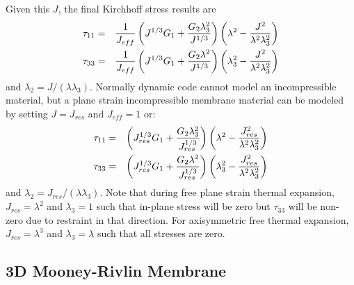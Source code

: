 \documentclass[11pt]{book}
\def\Jeff{J_{eff}}
\def\Jres{J_{res}}
\begin{document}
Given this $J$, the final Kirchhoff stress results are
\begin{eqnarray}
     \tau_{11} & = & {1\over \Jeff}\left(J^{1/3}G_1 + {G_2\lambda_3^2\over J^{1/3}}\right)
                       \left(\lambda^2-{J^2\over\lambda^2\lambda_3^2}\right) \\
     \tau_{33} & = & {1\over \Jeff}\left(J^{1/3}G_1 + {G_2\lambda^2\over J^{1/3}}\right)\left(\lambda_3^2-{J^2\over\lambda^2\lambda_3^2}\right)
\end{eqnarray}
and $\lambda_2 = J/(\lambda\lambda_3)$. Normally dynamic code cannot model an incompressible material, but a plane strain incompressible membrane material can be modeled by setting $J=\Jres$ and $\Jeff=1$ or:
\begin{eqnarray}
     \tau_{11} & = & \left(\Jres^{1/3}G_1 + {G_2\lambda_3^2\over \Jres^{1/3}}\right)
                       \left(\lambda^2-{\Jres^2\over\lambda^2\lambda_3^2}\right) \\
     \tau_{33} & = & \left(\Jres^{1/3}G_1 + {G_2\lambda^2\over \Jres^{1/3}}\right)
                          \left(\lambda_3^2-{\Jres^2\over\lambda^2\lambda_3^2}\right)
\end{eqnarray}
and $\lambda_2 = \Jres/(\lambda\lambda_3)$. Note that during free plane strain thermal expansion, $\Jres=\lambda^2$ and $\lambda_3=1$ such that in-plane stress will be zero but $\tau_{33}$ will be non-zero due to restraint in that direction. For axisymmetric free thermal expansion, $\Jres=\lambda^3$ and $\lambda_3=\lambda$ such that all stresses are zero.

\subsection{3D Mooney-Rivlin Membrane}
\end{document}
